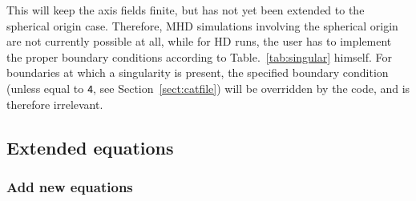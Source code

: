 This will keep the axis fields finite, but has not yet been extended to the
spherical origin case. Therefore, MHD simulations involving the spherical
origin are not currently possible at all, while for HD runs, the user has to
implement the proper boundary conditions according to
Table.~\ref{tab:singular} himself.
For boundaries at which a singularity is present, the specified boundary
condition (unless equal to {\tt 4}, see Section~\ref{sect:catfile}) will be
overridden by the code, and is therefore irrelevant.



\subsection{Extended equations}
\label{sec:extend}

\subsubsection{Add new equations}

